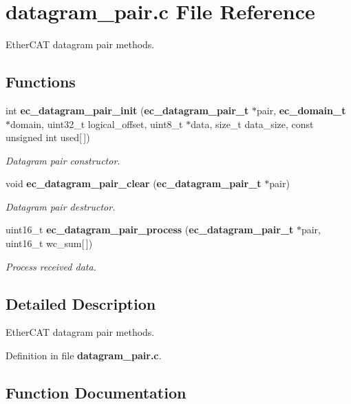 \section{datagram\-\_\-pair.\-c \-File \-Reference}
\label{datagram__pair_8c}


\-Ether\-C\-A\-T datagram pair methods.  


\subsection*{\-Functions}
\begin{DoxyCompactItemize}
\item 
int {\bf ec\-\_\-datagram\-\_\-pair\-\_\-init} ({\bf ec\-\_\-datagram\-\_\-pair\-\_\-t} $\ast$pair, {\bf ec\-\_\-domain\-\_\-t} $\ast$domain, uint32\-\_\-t logical\-\_\-offset, uint8\-\_\-t $\ast$data, size\-\_\-t data\-\_\-size, const unsigned int used[$\,$])
\begin{DoxyCompactList}\small\item\em \-Datagram pair constructor. \end{DoxyCompactList}\item 
void {\bf ec\-\_\-datagram\-\_\-pair\-\_\-clear} ({\bf ec\-\_\-datagram\-\_\-pair\-\_\-t} $\ast$pair)
\begin{DoxyCompactList}\small\item\em \-Datagram pair destructor. \end{DoxyCompactList}\item 
uint16\-\_\-t {\bf ec\-\_\-datagram\-\_\-pair\-\_\-process} ({\bf ec\-\_\-datagram\-\_\-pair\-\_\-t} $\ast$pair, uint16\-\_\-t wc\-\_\-sum[$\,$])
\begin{DoxyCompactList}\small\item\em \-Process received data. \end{DoxyCompactList}\end{DoxyCompactItemize}


\subsection{\-Detailed \-Description}
\-Ether\-C\-A\-T datagram pair methods. 

\-Definition in file {\bf datagram\-\_\-pair.\-c}.



\subsection{\-Function \-Documentation}
